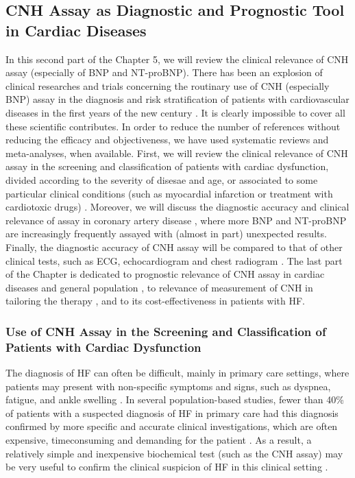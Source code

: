 \documentclass[14pt,a4paper,onecolumn]{extarticle}
\begin{document}
\subsection{ CNH Assay as Diagnostic and Prognostic Tool in Cardiac Diseases}
In this second part of the Chapter 5, we will review the clinical relevance of CNH assay
(especially of BNP and NT-proBNP). There has been an explosion of clinical researches and trials concerning the routinary use of CNH (especially BNP) assay in the diagnosis and risk stratification of patients with cardiovascular diseases in the first years of
the new century . It is clearly impossible to cover all these scientific contributes. In order to reduce the number of references
without reducing the efficacy and objectiveness, we have used systematic reviews and
meta-analyses, when available.
First, we will review the clinical relevance of CNH assay in the screening and classification of patients with cardiac dysfunction, divided according to the severity of disesae and age, or associated to some particular clinical conditions (such as myocardial
infarction or treatment with cardiotoxic drugs) . Moreover, we will discuss the diagnostic accuracy and clinical relevance of assay in coronary artery disease , where more  BNP and NT-proBNP are increasingly frequently assayed with (almost in part) unexpected results. Finally, the diagnostic accuracy of CNH assay will be compared to that of other clinical tests, such as ECG,
echocardiogram and chest radiogram .
The last part of the Chapter is dedicated to prognostic relevance of CNH assay in
cardiac diseases and general population , to relevance of
measurement of CNH in tailoring the therapy , and to its cost-effectiveness  in patients with HF.

\subsubsection{ Use of CNH Assay in the Screening and Classification of Patients with Cardiac Dysfunction}

The diagnosis of HF can often be difficult, mainly in primary care settings, where patients may present with non-specific symptoms and signs, such as dyspnea, fatigue, and ankle swelling \citep{bib368} \citep{bib369} \citep{bib370}. In several population-based studies, fewer than 40\% of patients with a suspected diagnosis of HF in primary care had this diagnosis confirmed by more specific and accurate clinical investigations, which are often expensive, timeconsuming and demanding for the patient \citep{bib368} \citep{bib369} \citep{bib370} \citep{bib3104} \citep{bib3105}. As a result, a relatively simple and inexpensive biochemical test (such as the CNH assay) may be very useful to confirm the clinical suspicion of HF in this clinical setting \citep{bib35} \citep{bib334} \citep{bib335}.
\end{document}
